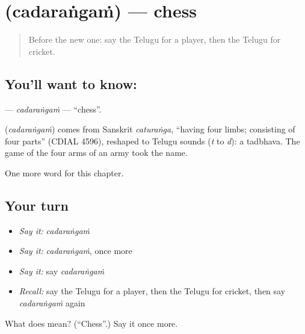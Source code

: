 \section[\texorpdfstring{\te{చదరంగం} (cadaraṅgaṁ)}{చదరంగం (cadaraṅgaṁ)}]{ (cadaraṅgaṁ) — chess}

\label{lesson:TE-C304-cadarangam}



\begin{quote}
Before the new one: say the Telugu for a player, then the Telugu for cricket.
\end{quote}

\subsection*{You'll want to know: }
\textbf{} — \emph{cadaraṅgaṁ} — \textquotedblleft{}chess\textquotedblright{}.

\begin{cousinweb}
\textbf{} (\emph{cadaraṅgaṁ}) comes from Sanskrit \emph{caturaṅga}, \textquotedblleft{}having four limbs; consisting of four parts\textquotedblright{} (CDIAL 4596), reshaped to Telugu sounds (\emph{t} to \emph{d}): a tadbhava. The game of the four arms of an army took the name.
\end{cousinweb}

\begin{grammarlens}[title={What you've built}]
One more word for this chapter.
\end{grammarlens}

\subsection*{Your turn}
\begin{itemize}
\raggedright
  \item \emph{Say it:} \emph{cadaraṅgaṁ}
  \item \emph{Say it:} \emph{cadaraṅgaṁ}, once more
  \item \emph{Say it:} say \emph{cadaraṅgaṁ}
  \item \emph{Recall:} say the Telugu for a player, then the Telugu for cricket, then say \emph{cadaraṅgaṁ} again
\end{itemize}

\begin{tcolorbox}[breakable,colback=teal!4,colframe=teal!35!black,title={Before you move on}]
What does  mean? (\textquotedblleft{}Chess\textquotedblright{}.) Say it once more.
\end{tcolorbox}
